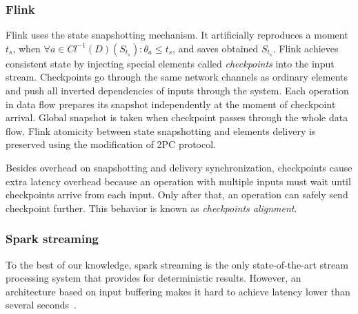 \subsubsection{Flink}

Flink uses the state snapshotting mechanism. It artificially reproduces a moment $t_s$, when $\forall{a}\in{Cl^{-1}(D)(S_{t_s})}:\theta_a \leq t_s$, and saves obtained $S_{t_s}$. Flink achieves consistent state by injecting special elements called {\em checkpoints} into the input stream. Checkpoints go through the same network channels as ordinary elements and push all inverted dependencies of inputs through the system. Each operation in data flow prepares its snapshot independently at the moment of checkpoint arrival. Global snapshot is taken when checkpoint passes through the whole data flow. Flink atomicity between state snapshotting and elements delivery is preserved using the modification of 2PC protocol.

Besides overhead on snapshotting and delivery synchronization, checkpoints cause extra latency overhead because an operation with multiple inputs must wait until checkpoints arrive from each input. Only after that, an operation can safely send checkpoint further. This behavior is known as {\em checkpoints alignment}.

\subsubsection{Spark streaming}

To the best of our knowledge, spark streaming is the only state-of-the-art stream processing system that provides for deterministic results. However, an architecture based on input buffering makes it hard to achieve latency lower than several seconds~\cite{7530084, 7474816}. 
